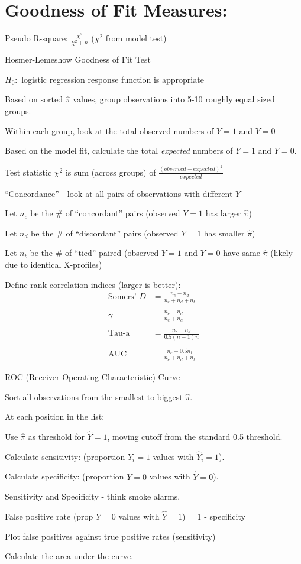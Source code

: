 \documentclass[12pt]{../notes}
\begin{document}
\section{Goodness of Fit Measures:}
\bi
\item Pseudo R-square: $\frac{\chi^2}{\chi^2 +n}$ ($\chi^2$ from model test)
\item Hosmer-Lemeshow Goodness of Fit Test
\bi
\item $H_0:$ logistic regression response function is appropriate 
\item Based on sorted $\hat{\pi}$ values, group observations into 5-10 roughly equal sized groups. 
\item Within each group, look at the total observed numbers of $Y=1$ and $Y=0$
\item Based on the model fit, calculate the total \textit{expected} numbers of $Y=1$ and $Y=0$. 
\item Test statistic $\chi^2$ is sum (across groups) of $\frac{(observed - expected)^2}{expected}$
\ei
\item ``Concordance'' - look at all pairs of observations with different $Y$
\bi
\item Let $n_c$ be the \# of ``concordant'' pairs (observed $Y=1$ has larger $\hat{\pi}$)
\item Let $n_d$ be the \# of ``discordant'' pairs (observed $Y=1$ has smaller $\hat{\pi}$)
\item Let $n_t$ be the \# of ``tied'' paired (observed $Y=1$ and $Y=0$ have same $\hat{\pi}$ (likely due to identical X-profiles)
\item Define rank correlation indices (larger is better):
\begin{align*}
\text{Somers' }D &= \frac{n_c - n_d}{n_c+n_d+n_t} \\
\\
\gamma &= \frac{n_c-n_d}{n_c + n_d} \\
\\
\text{Tau-a} &= \frac{n_c - n_d}{0.5(n-1)n} \\
\\
\text{AUC} &=  \frac{n_c + 0.5n_t}{n_c+n_d+n_t} 
\end{align*}
\ei
\item ROC (Receiver Operating Characteristic) Curve
\bi
\item Sort all observations from the smallest to biggest $\hat{\pi}.$
\item At each position in the list:
\bi
\item Use $\hat{\pi}$ as threshold for $\hat{Y} = 1$, moving cutoff from the standard 0.5 threshold. 
\item Calculate sensitivity: (proportion $Y_i=1$ values with $\hat{Y}_i = 1$).
\item Calculate specificity: (proportion $Y = 0$ values with $\hat{Y} = 0$). 
\bi
\item Sensitivity and Specificity - think smoke alarms.
\ei
\item False positive rate (prop $Y=0$ values with $\hat{Y} = 1$) = 1 - specificity
\item Plot false positives against true positive rates (sensitivity)
\item Calculate the area under the curve. 
\ei
\ei
\ei
\end{document}
